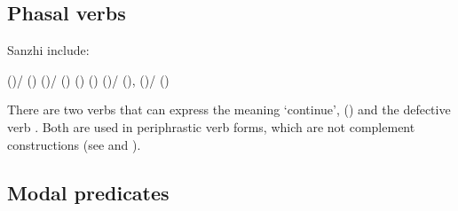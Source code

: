 \subsection{Phasal verbs}
\label{ssec:Phasal verbs}

Sanzhi  include:
%
\begin{exe}
	\ex	\label{ex:phasal verbs}
	\begin{xlist}
		\ex	{} ()\slash{} () 
		\ex {} ()\slash{} () 
		\ex	{} ()  () 
		\ex	{} ()\slash{} (),  ()\slash{} () 
	\end{xlist}
\end{exe}

There are two verbs that can express the meaning `continue',  ()  and the defective verb  . Both are used in periphrastic verb forms, which are not complement constructions (see  and ).


\subsection{Modal predicates}
\label{ssec:Modal predicates}

